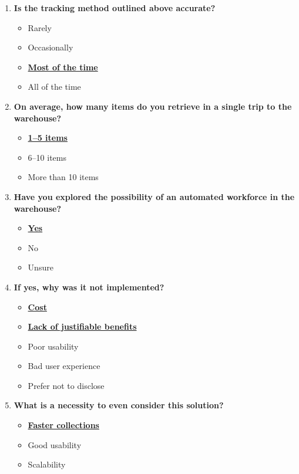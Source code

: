 \begin{enumerate}
    \item \textbf{Is the tracking method outlined above accurate?}
    \begin{itemize}
        \item Rarely
        \item Occasionally
        \item \textbf{\underline{Most of the time}}
        \item All of the time
    \end{itemize}

    \item \textbf{On average, how many items do you retrieve in a single trip to the warehouse?}
    \begin{itemize}
        \item \textbf{\underline{1–5 items}}
        \item 6–10 items
        \item More than 10 items
    \end{itemize}
    
    \newpage

    \item \textbf{Have you explored the possibility of an automated workforce in the warehouse?}
    \begin{itemize}
        \item \textbf{\underline{Yes}}
        \item No
        \item Unsure
    \end{itemize}

    \item \textbf{If yes, why was it not implemented?}
    \begin{itemize}
        \item \textbf{\underline{Cost}}
        \item \textbf{\underline{Lack of justifiable benefits}}
        \item Poor usability
        \item Bad user experience
        \item Prefer not to disclose
    \end{itemize}

    \item \textbf{What is a necessity to even consider this solution?}
    \begin{itemize}
        \item \textbf{\underline{Faster collections}}
        \item Good usability
        \item Scalability
    \end{itemize}
\end{enumerate}

